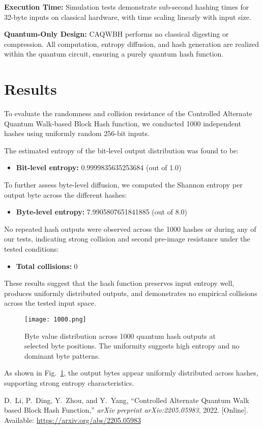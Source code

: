\documentclass[conference]{IEEEtran}
\begin{document}
\textbf{Execution Time:} Simulation tests demonstrate sub-second hashing times for 32-byte inputs on classical hardware, with time scaling linearly with input size.

\textbf{Quantum-Only Design:} CAQWBH performs no classical digesting or compression. All computation, entropy diffusion, and hash generation are realized within the quantum circuit, ensuring a purely quantum hash function.

\section{Results}

To evaluate the randomness and collision resistance of the Controlled Alternate Quantum Walk-based Block Hash function, we conducted 1000 independent hashes using uniformly random 256-bit inputs.

The estimated entropy of the bit-level output distribution was found to be:
\begin{itemize}
    \item \textbf{Bit-level entropy:} 0.9999835635253684 (out of 1.0)
\end{itemize}

To further assess byte-level diffusion, we computed the Shannon entropy per output byte across the different hashes:
\begin{itemize}
    \item \textbf{Byte-level entropy:}  7.9905807651841885 (out of 8.0)
\end{itemize}

No repeated hash outputs were observed across the 1000 hashes or during any of our tests, indicating strong collision and second pre-image resistance under the tested conditions:
\begin{itemize}
    \item \textbf{Total collisions:} 0
\end{itemize}

These results suggest that the hash function preserves input entropy well, produces uniformly distributed outputs, and demonstrates no empirical collisions across the tested input space.

\begin{figure}[!t]
    \centering
    \texttt{[image: 1000.png]}
    \caption{Byte value distribution across 1000 quantum hash outputs at selected byte positions. The uniformity suggests high entropy and no dominant byte patterns.}
    \label{fig:byte_distribution}
\end{figure}

As shown in Fig.~\ref{fig:byte_distribution}, the output bytes appear uniformly distributed across hashes, supporting strong entropy characteristics.


\begin{thebibliography}{1}

D.~Li, P.~Ding, Y.~Zhou, and Y.~Yang, ``Controlled Alternate Quantum Walk based Block Hash Function,'' \textit{arXiv preprint arXiv:2205.05983}, 2022. [Online]. Available: \url{https://arxiv.org/abs/2205.05983}

\end{thebibliography}
\end{document}
